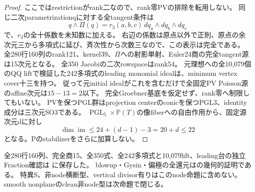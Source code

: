 \documentclass[a4paper,11pt]{ltjsarticle}
\theoremstyle{definition}
\newcommand{\PGL}{\operatorname{PGL}}
\begin{document}
\begin{proof}
ここではrestrictionがrank二なので、rank零PVの排除を転用しない。
同じ二次parametrizationqに対する全tangent条件は
\[
 q\wedge\Pi(q)=r_3(a,b,c)\,dq_a\wedge dq_b\wedge dq_c
\]
で、$r_3$の全十係数を未知数に加える。
右辺の係数は原点以外で正則、原点の余次元三から多項式に延び、斉次性から次数三なので、この表示は完全である。
全280行160列のrank121、kernel39、$\Pi$への射影単射、Euler24商の完全tangent源は15次元となる。
全350 Jacobiの二次rowspaceはrank54。
元理想への全10,079個のQQ liftで検証した242多項式のleading monomial idealは、minimum vertex cover十三を持つ。
従って元initial idealがこれを含むだけで全固定PV Poisson源のaffine次元は$15-13=2$以下。
完全Groebner基底を仮定せず、rank零へ制限してもいない。
PVを保つPGL群はprojection centerのconicを保つPGL3、identity成分は三次元SO3である。
$\PGL_5\times\mathbb P(T)$の像fiberへの自由作用から、固定源次元dに対し
\[
 \dim\operatorname{im}\le24+(d-1)-3=20+d\le22
\]
となる。Pのstabilizerをさらに加算しない。
\end{proof}
全280行160列、完全商15、全350式、全242多項式と10,079lift、leading台の独立Fraction確認は
に保存した。
blowup・Gysin・偏極の全還元はの幾何的証明である。
特異S、非node横断型、vertical divisor有りはこのnode命題に含めない。
smooth nonplaneのclean非node型は次命題で閉じる。
\end{document}
